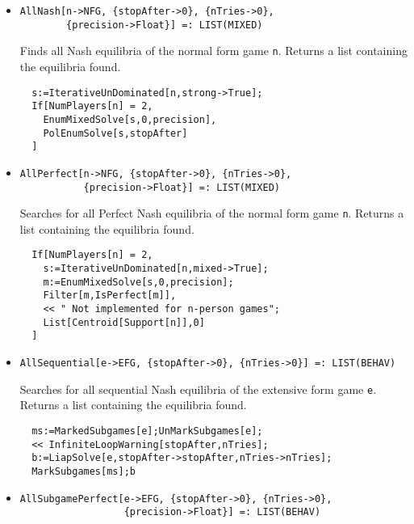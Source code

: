 \begin{itemize}
\item{}
\protect \large \begin{verbatim}
AllNash[n->NFG, {stopAfter->0}, {nTries->0}, 
        {precision->Float}] =: LIST(MIXED) 
\end{verbatim}\normalsize

\bd 
Finds all Nash equilibria of the normal form game
\verb+n+.  Returns a list containing the equilibria found.

\begin{verbatim}
  s:=IterativeUnDominated[n,strong->True];
  If[NumPlayers[n] = 2, 
    EnumMixedSolve[s,0,precision],
    PolEnumSolve[s,stopAfter]
  ]
\end{verbatim} 
\ed

\item{}
\protect \large \begin{verbatim}
AllPerfect[n->NFG, {stopAfter->0}, {nTries->0}, 
           {precision->Float}] =: LIST(MIXED) 
\end{verbatim}\normalsize

\bd 
Searches for all Perfect Nash equilibria of the normal form game
\verb+n+.  Returns a list containing the equilibria found.

\begin{verbatim}
  If[NumPlayers[n] = 2, 
    s:=IterativeUnDominated[n,mixed->True];
    m:=EnumMixedSolve[s,0,precision];
    Filter[m,IsPerfect[m]],
    << " Not implemented for n-person games";
    List[Centroid[Support[n]],0]
  ]
\end{verbatim} 
\ed

\item{}
\protect \large \begin{verbatim}
AllSequential[e->EFG, {stopAfter->0}, {nTries->0}] =: LIST(BEHAV) 
\end{verbatim}\normalsize

\bd 
Searches for all sequential Nash equilibria of the extensive form
game \verb+e+.  Returns a list containing the equilibria found.

\begin{verbatim}
  ms:=MarkedSubgames[e];UnMarkSubgames[e];
  << InfiniteLoopWarning[stopAfter,nTries];
  b:=LiapSolve[e,stopAfter->stopAfter,nTries->nTries];
  MarkSubgames[ms];b
\end{verbatim} 
\ed

\item{}
\protect \large \begin{verbatim}
AllSubgamePerfect[e->EFG, {stopAfter->0}, {nTries->0}, 
                  {precision->Float}] =: LIST(BEHAV) 
\end{verbatim}\normalsize


\end{itemize}
